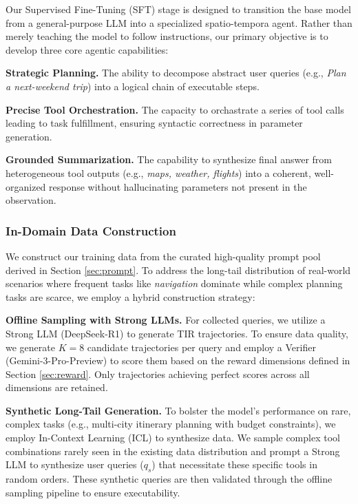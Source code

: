 \documentclass{article} %
\begin{document}
Our Supervised Fine-Tuning (SFT) stage is designed to transition the base model from a general-purpose LLM into a specialized spatio-tempora agent. Rather than merely teaching the model to follow instructions, our primary objective is to develop three core agentic capabilities:

\textbf{Strategic Planning.} The ability to decompose abstract user queries (e.g., \textit{Plan a next-weekend trip}) into a logical chain of executable steps.

\textbf{Precise Tool Orchestration.} The capacity to orchastrate a series of tool calls leading to task fulfillment, ensuring syntactic correctness in parameter generation.

\textbf{Grounded Summarization.} The capability to synthesize final answer from heterogeneous tool outputs (e.g., \textit{maps, weather, flights}) into a coherent, well-organized response without hallucinating parameters not present in the observation.

\subsubsection{In-Domain Data Construction}

We construct our training data from the curated high-quality prompt pool derived in Section \ref{sec:prompt}. To address the long-tail distribution of real-world scenarios where frequent tasks like \textit{navigation} dominate while complex planning tasks are scarce, we employ a hybrid construction strategy:

\textbf{Offline Sampling with Strong LLMs.} For collected queries, we utilize a Strong LLM (DeepSeek-R1) to generate TIR trajectories. To ensure data quality, we generate $K=8$ candidate trajectories per query and employ a Verifier (Gemini-3-Pro-Preview) to score them based on the reward dimensions defined in Section \ref{sec:reward}. Only trajectories achieving perfect scores across all dimensions are retained.

\textbf{Synthetic Long-Tail Generation.} To bolster the model's performance on rare, complex tasks (e.g., multi-city itinerary planning with budget constraints), we employ In-Context Learning (ICL) to synthesize data. We sample complex tool combinations rarely seen in the existing data distribution and prompt a Strong LLM to synthesize user queries ($q_s$) that necessitate these specific tools in random orders. These synthetic queries are then validated through the offline sampling pipeline to ensure executability.
\end{document}
